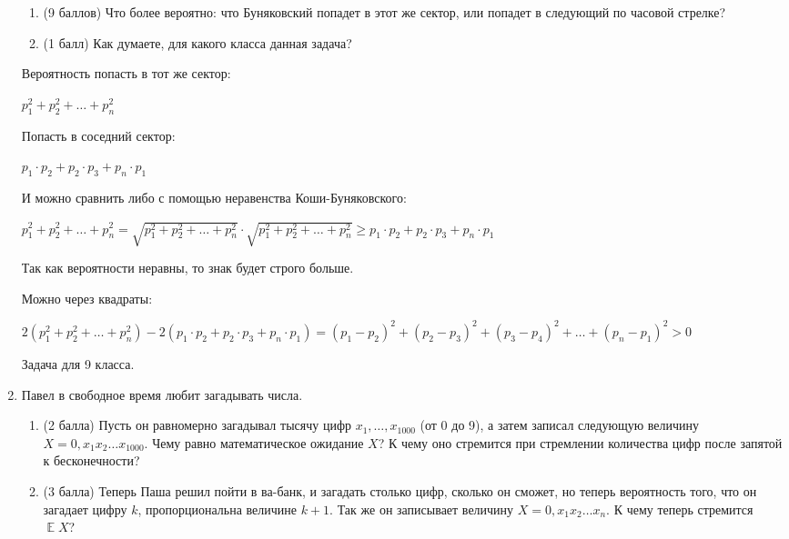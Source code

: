 \documentclass[12pt]{article}
\DeclareMathOperator{\E}{\mathbb{E}}
\newenvironment{solution}{}{}
\begin{document}
\begin{enumerate}
    \begin{enumerate}
        \item (9 баллов) Что более вероятно: что Буняковский попадет в этот же сектор, или попадет в следующий по часовой стрелке?
        \item (1 балл) Как думаете, для какого класса данная задача?
    \end{enumerate}
    
\begin{solution}
    Вероятность попасть в тот же сектор:
    
    $p_1^2 + p_2^2 + \dots + p_n^2$
    
    Попасть в соседний сектор:
    
    $p_1 \cdot p_2 + p_2 \cdot p_3 + p_n \cdot p_1$
    
    И можно сравнить либо с помощью неравенства Коши-Буняковского:
    
     $p_1^2 + p_2^2 + \dots + p_n^2 = \sqrt{p_1^2 + p_2^2 + \dots + p_n^2} \cdot \sqrt{p_1^2 + p_2^2 + \dots + p_n^2} \geq p_1 \cdot p_2 + p_2 \cdot p_3 + p_n \cdot p_1$
     
     Так как вероятности неравны, то знак будет строго больше.
     
     Можно через квадраты:
     
     $2(p_1^2 + p_2^2 + \dots + p_n^2) - 2(p_1 \cdot p_2 + p_2 \cdot p_3 + p_n \cdot p_1) = (p_1 - p_2)^2 + (p_2 - p_3)^2 + (p_3 - p_4)^2 + \dots + (p_n - p_1)^2 > 0$
     
     Задача для 9 класса.
\end{solution}
    
    \item Павел в свободное время любит загадывать числа.
    
    \begin{enumerate}
        \item (2 балла) Пусть он равномерно загадывал тысячу цифр $x_1, \dots, x_{1000}$ (от 0 до 9), а затем записал следующую величину $X = 0,x_1 x_2 \dots x_{1000}$. Чему равно математическое ожидание $X$? К чему оно стремится при стремлении количества цифр после запятой к бесконечности?
        \item (3 балла) Теперь Паша решил пойти в ва-банк, и загадать столько цифр, сколько он сможет, но теперь вероятность того, что он загадает цифру $k$, пропорциональна величине $k + 1$. Так же он записывает величину $X = 0,x_1 x_2 \dots x_n$. К чему теперь стремится $\E{X}$?
    \end{enumerate}
    

\end{enumerate}
\end{document}
